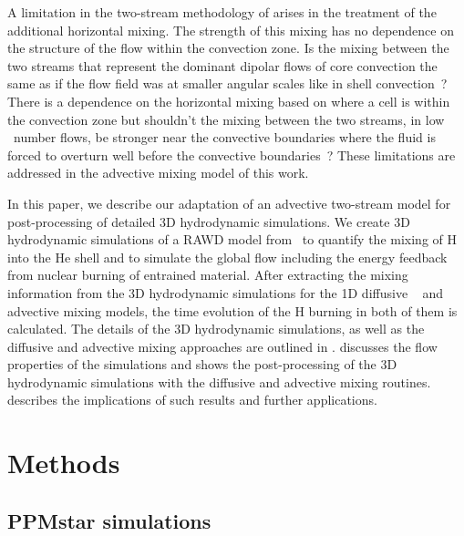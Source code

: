 \documentclass[fleqn,usenatbib]{mnras}
\begin{document}
A limitation in the two-stream methodology of  arises in
the treatment of the additional horizontal mixing. The strength of
this mixing has no dependence on the structure of the flow within the
convection zone. Is the mixing between the two streams that represent
the dominant dipolar flows of core convection the same as if the flow
field was at smaller angular scales like in shell
convection~\citep{chandrabook1961}? There is a dependence on the
horizontal mixing based on where a cell is within the convection zone
but shouldn't the mixing between the two streams, in low \mach~number
flows, be stronger near the convective boundaries where the fluid is
forced to overturn well before the convective
boundaries~\citep{Jones:2017kc}? These limitations are addressed in
the advective mixing model of this work.

In this paper, we describe our adaptation of an advective two-stream
model for post-processing of detailed 3D hydrodynamic simulations. We
create 3D hydrodynamic simulations of a RAWD model
from~\citet{Denissenkov:19} to quantify the mixing of H into the He
shell and to simulate the global flow including the energy feedback
from nuclear burning of entrained material. After extracting the
mixing information from the 3D hydrodynamic simulations for the 1D
diffusive ~\citep{Jones:2017kc} and advective mixing models, the time
evolution of the H burning in both of them is calculated.  The details
of the 3D hydrodynamic simulations, as well as the diffusive and
advective mixing approaches are outlined in .
 discusses the flow properties of the simulations and shows the post-processing of the 3D hydrodynamic
simulations with the diffusive and advective mixing routines.
 describes the implications of such results and
further applications.


\section{Methods}
\label{sec:allmethods}

\subsection{PPMstar simulations}
\label{sec:ppmsim}
\end{document}
